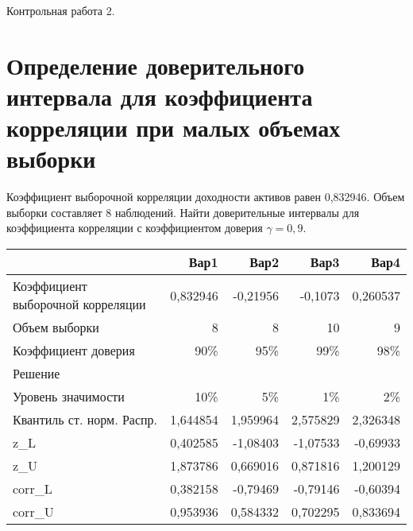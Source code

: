 \documentclass[12pt,a4paper]{article}
\begin{document}
\huge{Контрольная работа 2.}
\normalsize
\section{Определение доверительного интервала для коэффициента корреляции при малых объемах выборки}
\begin{taskrus}
Коэффициент выборочной корреляции доходности активов равен 0,832946. Объем выборки составляет 8 наблюдений. Найти доверительные интервалы для коэффициента корреляции с коэффициентом доверия $\gamma=0,9$. 

\begin{table}[H]
  \centering
    \begin{tabular}{lrrrr}
    \toprule
          & Вар1  & Вар2  & Вар3  & Вар4 \\
    \midrule
    Коэффициент выборочной корреляции & 0,832946 & -0,21956 & -0,1073 & 0,260537 \\
    Объем выборки & 8     & 8     & 10    & 9 \\
    Коэффициент доверия & 90\%  & 95\%  & 99\%  & 98\% \\
    Решение &       &       &       &  \\
    Уровень значимости & 10\%  & 5\%   & 1\%   & 2\% \\
    Квантиль ст. норм. Распр. & 1,644854 & 1,959964 & 2,575829 & 2,326348 \\
    z\_L  & 0,402585 & -1,08403 & -1,07533 & -0,69933 \\
    z\_U  & 1,873786 & 0,669016 & 0,871816 & 1,200129 \\
    corr\_L & 0,382158 & -0,79469 & -0,79146 & -0,60394 \\
    corr\_U & 0,953936 & 0,584332 & 0,702295 & 0,833694 \\
    \bottomrule
    \end{tabular}%
  \label{tab:addlabel}%
\end{table}%


\end{taskrus}
\end{document}
